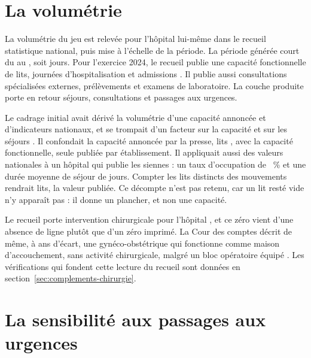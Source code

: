 \section{La volumétrie}

La volumétrie du jeu est relevée pour l'hôpital lui-même dans le recueil statistique national, puis
mise à l'échelle de la période. La période générée court du  au
, soit  jours. Pour l'exercice 2024, le recueil publie
une capacité fonctionnelle de  lits, 
journées d'hospitalisation et  admissions \cite{s30}. Il publie aussi
 consultations spécialisées externes, 
prélèvements et  examens de laboratoire. La couche produite porte en retour
 séjours,  consultations et
 passages aux urgences.

Le cadrage initial avait dérivé la volumétrie d'une capacité annoncée et d'indicateurs nationaux,
et se trompait d'un facteur  sur la capacité et  sur les séjours \cite{s30}. Il confondait la capacité annoncée par la presse,
 lits \cite{s29}, avec la capacité fonctionnelle, seule publiée par
établissement. Il appliquait aussi des valeurs nationales à un hôpital qui publie les siennes : un
taux d'occupation de ~\% et une durée moyenne de séjour de 
jours. Compter les lits distincts des mouvements rendrait  lits,
la valeur publiée. Ce décompte n'est pas retenu, car un lit resté vide n'y apparaît pas : il donne
un plancher, et non une capacité.

Le recueil porte  intervention chirurgicale pour l'hôpital \cite{s30},
et ce zéro vient d'une absence de ligne plutôt que d'un zéro imprimé. La Cour des comptes décrit de
même, à  ans d'écart, une gynéco-obstétrique qui fonctionne comme maison d'accouchement, sans
activité chirurgicale, malgré un bloc opératoire équipé \cite{s20}. Les  vérifications qui fondent cette lecture du
recueil sont données en section~\ref{sec:complements-chirurgie}.

\section{La sensibilité aux passages aux urgences}\label{sec:sensibilite}

